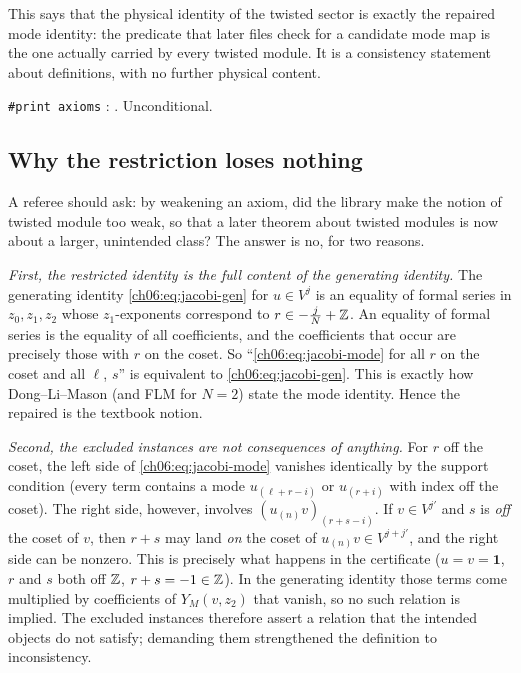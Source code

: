 \begin{physics}
This says that the physical identity of the twisted sector is exactly the repaired mode identity: the predicate that later files check for a candidate mode map is the one actually carried by every twisted module. It is a consistency statement about definitions, with no further physical content.
\end{physics}
\begin{status}
\texttt{\#print axioms} : .  Unconditional.
\end{status}

\subsection{Why the restriction loses nothing}\label{ch06:sec:nothinglost}

A referee should ask: by weakening an axiom, did the library make the notion of twisted module too
weak, so that a later theorem about twisted modules is now about a larger, unintended class?
The answer is no, for two reasons.

\emph{First, the restricted identity is the full content of the generating identity.}  The
generating identity \eqref{ch06:eq:jacobi-gen} for $u\in V^j$ is an equality of formal series in
$z_0,z_1,z_2$ whose $z_1$-exponents correspond to $r\in-\frac jN+{\mathbb{Z}}$.  An equality of formal series
is the equality of all coefficients, and the coefficients that occur are precisely those with $r$
on the coset.  So ``\eqref{ch06:eq:jacobi-mode} for all $r$ on the coset and all $\ell$, $s$'' is
equivalent to \eqref{ch06:eq:jacobi-gen}.  This is exactly how Dong--Li--Mason (and FLM for $N=2$)
state the mode identity.  Hence the repaired  is the textbook notion.

\emph{Second, the excluded instances are not consequences of anything.}  For $r$ off the coset,
the left side of \eqref{ch06:eq:jacobi-mode} vanishes identically by the support condition (every
term contains a mode $u_{(\ell+r-i)}$ or $u_{(r+i)}$ with index off the coset).  The right side,
however, involves $(u_{(n)}v)_{(r+s-i)}$.  If $v\in V^{j'}$ and $s$ is \emph{off} the coset of $v$,
then $r+s$ may land \emph{on} the coset of $u_{(n)}v\in V^{j+j'}$, and the right side can be
nonzero.  This is precisely what happens in the certificate ($u=v=\mathbf 1$, $r$ and $s$ both off
${\mathbb{Z}}$, $r+s=-1\in{\mathbb{Z}}$).  In the generating identity those terms come multiplied by coefficients of
$Y_M(v,z_2)$ that vanish, so no such relation is implied.  The excluded instances therefore assert
a relation that the intended objects do not satisfy; demanding them strengthened the definition to
inconsistency.

